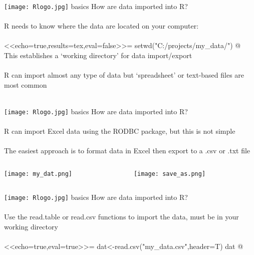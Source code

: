 \documentclass[xcolor=svgnames]{beamer}
\begin{document}
\begin{frame}[t,fragile]{\texttt{[image: Rlogo.jpg]} \hspace{0.01in} basics}
How are data imported into R?\\~\\
R needs to know where the data are located on your computer:\\~\\
<<echo=true,results=tex,eval=false>>=
setwd("C:/projects/my_data/")
@
\vspace{0.2in}
This establishes a `working directory' for data import/export\\~\\
R can import almost any type of data but `spreadsheet' or text-based files are most common \\~\\
\end{frame}

\begin{frame}[t,fragile]{\texttt{[image: Rlogo.jpg]} \hspace{0.01in} basics}
How are data imported into R?\\~\\
R can import Excel data using the RODBC package, but this is not simple\\~\\
The easiest approach is to format data in Excel then export to a .csv or .txt file
\begin{columns}
\begin{column}{0.43\textwidth}
\begin{center}
\texttt{[image: my\_dat.png]}
\end{center}
\end{column}
\begin{column}{0.66\textwidth}
\begin{center}
\texttt{[image: save\_as.png]}
\end{center}
\end{column}
\end{columns}
\end{frame}

\begin{frame}[t,fragile]{\texttt{[image: Rlogo.jpg]} \hspace{0.01in} basics}
How are data imported into R?\\~\\
Use the read.table or read.csv functions to import the data, must be in your working directory\\~\\
<<echo=true,eval=true>>=
dat<-read.csv("my_data.csv",header=T)
dat
@
\end{frame}
\end{document}
